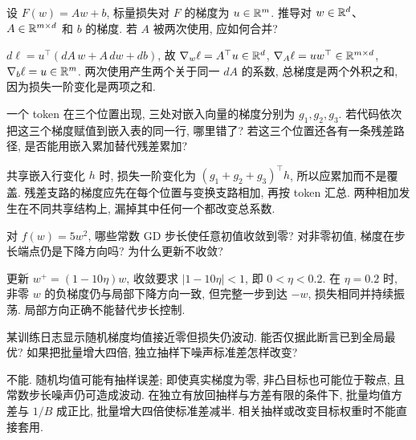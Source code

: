 \begin{exercise}
设 $F(w)=Aw+b$, 标量损失对 $F$ 的梯度为 $u\in\mathbb R^m$. 推导对 $w\in\mathbb R^d$、$A\in\mathbb R^{m\times d}$ 和 $b$ 的梯度. 若 $A$ 被两次使用, 应如何合并?
\end{exercise}
\begin{solution}
$d\ell=u^\top(dA\,w+A\,dw+db)$, 故 $\nabla_w\ell=A^\top u\in\mathbb R^d$, $\nabla_A\ell=uw^\top\in\mathbb R^{m\times d}$, $\nabla_b\ell=u\in\mathbb R^m$. 两次使用产生两个关于同一 $dA$ 的系数, 总梯度是两个外积之和, 因为损失一阶变化是两项之和.
\end{solution}
\begin{exercise}
一个 token 在三个位置出现, 三处对嵌入向量的梯度分别为 $g_1,g_2,g_3$. 若代码依次把这三个梯度赋值到嵌入表的同一行, 哪里错了? 若这三个位置还各有一条残差路径, 是否能用嵌入累加替代残差累加?
\end{exercise}
\begin{solution}
共享嵌入行变化 $h$ 时, 损失一阶变化为 $(g_1+g_2+g_3)^\top h$, 所以应累加而不是覆盖. 残差支路的梯度应先在每个位置与变换支路相加, 再按 token 汇总. 两种相加发生在不同共享结构上, 漏掉其中任何一个都改变总系数.
\end{solution}
\begin{exercise}
对 $f(w)=5w^2$, 哪些常数 GD 步长使任意初值收敛到零? 对非零初值, 梯度在步长端点仍是下降方向吗? 为什么更新不收敛?
\end{exercise}
\begin{solution}
更新 $w^+=(1-10\eta)w$, 收敛要求 $|1-10\eta|<1$, 即 $0<\eta<0.2$. 在 $\eta=0.2$ 时, 非零 $w$ 的负梯度仍与局部下降方向一致, 但完整一步到达 $-w$, 损失相同并持续振荡. 局部方向正确不能替代步长控制.
\end{solution}
\begin{exercise}
某训练日志显示随机梯度均值接近零但损失仍波动. 能否仅据此断言已到全局最优? 如果把批量增大四倍, 独立抽样下噪声标准差怎样改变?
\end{exercise}
\begin{solution}
不能. 随机均值可能有抽样误差; 即使真实梯度为零, 非凸目标也可能位于鞍点, 且常数步长噪声仍可造成波动. 在独立有放回抽样与方差有限的条件下, 批量均值方差与 $1/B$ 成正比, 批量增大四倍使标准差减半. 相关抽样或改变目标权重时不能直接套用.
\end{solution}
\label{ch:end:04}
